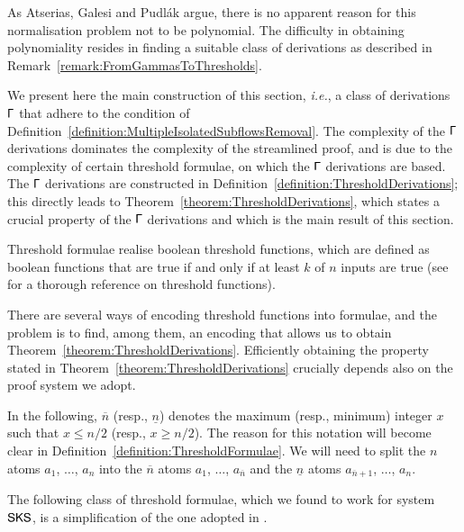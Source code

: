 As Atserias, Galesi and Pudl\'ak argue, there is no apparent reason for this normalisation problem not to be polynomial. The difficulty in obtaining polynomiality resides in finding a suitable class of derivations as described in Remark~\vref{remark:FromGammasToThresholds}.

We present here the main construction of this section, \emph{i.e.}, a class of derivations $\mathsf\Gamma$ that adhere to the condition of Definition~\vref{definition:MultipleIsolatedSubflowsRemoval}. The complexity of the $\mathsf\Gamma$ derivations dominates the complexity of the streamlined proof, and is due to the complexity of certain threshold formulae, on which the $\mathsf\Gamma$ derivations are based. The $\mathsf\Gamma$ derivations are constructed in Definition~\vref{definition:ThresholdDerivations}; this directly leads to Theorem~\vref{theorem:ThresholdDerivations}, which states a crucial property of the $\mathsf\Gamma$ derivations and which is the main result of this section.

Threshold formulae realise boolean threshold functions, which are defined as boolean functions that are true if and only if at least $k$ of $n$ inputs are true (see \cite{Wege:87:The-Comp:vn} for a thorough reference on threshold functions).

There are several ways of encoding threshold functions into formulae, and the problem is to find, among them, an encoding that allows us to obtain Theorem~\vref{theorem:ThresholdDerivations}. Efficiently obtaining the property stated in Theorem~\ref{theorem:ThresholdDerivations} crucially depends also on the proof system we adopt.


In the following, $\overline n$ (resp., $\underline n$) denotes the maximum (resp., minimum) integer $x$ such that $x\le n/2$ (resp., $x\ge n/2$). The reason for this notation will become clear in Definition~\vref{definition:ThresholdFormulae}. We will need to split the $n$ atoms $a_1$, $\dots$, $a_n$ into the $\overline n$ atoms $a_1$, $\dots$, $a_{\overline n}$ and the $\underline n$ atoms $a_{\overline n+1}$, $\dots$, $a_n$.

The following class of threshold formulae, which we found to work for system $\mathsf{SKS}$, is a simplification of the one adopted in \cite{AtseGalePudl:02:Monotone:yu}.

\newcommand{\avec}[2]{(a_{#1},\dots,a_{#2})}

